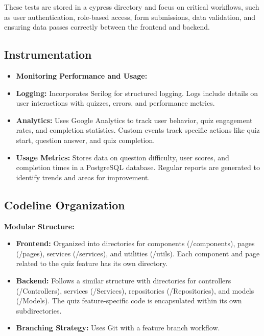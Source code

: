 These tests are stored in a cypress directory and focus on critical workflows, such as user authentication, role-based access, form submissions, data validation, and ensuring data passes correctly between the frontend and backend.

\subsection{Instrumentation}


\begin{itemize}

  \item \textbf{Monitoring Performance and Usage:}

  \item \textbf{Logging:} Incorporates Serilog for structured logging. Logs include details on user interactions with quizzes, errors, and performance metrics.

  \item \textbf{Analytics:} Uses Google Analytics to track user behavior, quiz engagement rates, and completion statistics. Custom events track specific actions like quiz start, question answer, and quiz completion.

  \item \textbf{Usage Metrics:} Stores data on question difficulty, user scores, and completion times in a PostgreSQL database. Regular reports are generated to identify trends and areas for improvement.
\end{itemize}



\subsection{Codeline Organization}

\textbf{Modular Structure:}

\begin{itemize}

  \item \textbf{Frontend:} Organized into directories for components (/components), pages (/pages), services (/services), and utilities (/utils). Each component and page related to the quiz feature has its own directory.

  \item \textbf{Backend:} Follows a similar structure with directories for controllers (/Controllers), services (/Services), repositories (/Repositories), and models (/Models). The quiz feature-specific code is encapsulated within its own subdirectories.

  \item \textbf{Branching Strategy:} Uses Git with a feature branch workflow.
\end{itemize}

